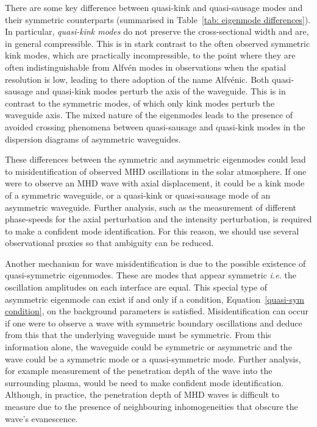 \documentclass[12pt]{ociamthesis}
\begin{document}
There are some key difference between quasi-kink and quasi-sausage modes and their symmetric counterparts (summarised in Table~\ref{tab: eigenmode differences}). In particular, \textit{quasi-kink modes} do not preserve the cross-sectional width and are, in general compressible. This is in stark contrast to the often observed symmetric kink modes, which are practically incompressible, to the point where they are often indistinguishable from Alfv\'{e}n modes in observations when the spatial resolution is low, leading to there adoption of the name Alfv\'{e}nic. Both quasi-sausage and quasi-kink modes perturb the axis of the waveguide. This is in contrast to the symmetric modes, of which only kink modes perturb the waveguide axis. The mixed nature of the eigenmodes leads to the presence of avoided crossing phenomena between quasi-sausage and quasi-kink modes in the dispersion diagrams of asymmetric waveguides.

These differences between the symmetric and asymmetric eigenmodes could lead to misidentification of observed MHD oscillations in the solar atmosphere. If one were to observe an MHD wave with axial displacement, it could be a kink mode of a symmetric waveguide, or a quasi-kink or quasi-sausage mode of an asymmetric waveguide. Further analysis, such as the measurement of different phase-speeds for the axial perturbation and the intensity perturbation, is required to make a confident mode identification. For this reason, we should use several observational proxies so that ambiguity can be reduced.

Another mechanism for wave misidentification is due to the possible existence of quasi-symmetric eigenmodes. These are modes that appear symmetric \textit{i.e.} the oscillation amplitudes on each interface are equal. This special type of asymmetric eigenmode can exist if and only if a condition, Equation~\eqref{quasi-sym condition}, on the background parameters is satisfied. Misidentification can occur if one were to observe a wave with symmetric boundary oscillations and deduce from this that the underlying waveguide must be symmetric. From this information alone, the waveguide could be symmetric or asymmetric and the wave could be a symmetric mode or a quasi-symmetric mode. Further analysis, for example measurement of the penetration depth of the wave into the surrounding plasma, would be need to make confident mode identification. Although, in practice, the penetration depth of MHD waves is difficult to measure due to the presence of neighbouring inhomogeneities that obscure the wave's evanescence.
\end{document}
